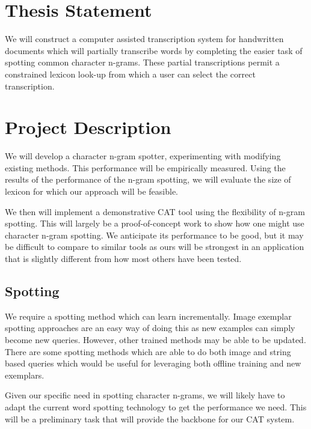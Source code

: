 \documentclass[ms]{byuprop}
\begin{document}
\section{Thesis Statement}


We will construct a computer assisted transcription system for handwritten documents which will partially transcribe words by completing the easier task of spotting common character n-grams. These partial transcriptions permit a constrained lexicon look-up from which a user can select the correct transcription. 

\section{Project Description}

We will develop a character n-gram spotter, experimenting with modifying existing methods.
This performance will be empirically measured. Using the results of the performance of the n-gram spotting, we will evaluate the size of lexicon for which our approach will be feasible.

We then will implement a demonstrative CAT tool using the flexibility of n-gram spotting. This will largely be a proof-of-concept work to show how one might use character n-gram spotting. We anticipate its performance to be good, but it may be difficult to compare to similar tools as ours will be strongest in an application that is slightly different from how most others have been tested.


\subsection{Spotting}
We require a spotting method which can learn incrementally. Image exemplar spotting approaches are an easy way of doing this as new examples can simply become new queries. However, other trained methods may be able to be updated. There are some spotting methods which are able to do both image and string based queries\cite{Almazan2014} which would be useful for leveraging both offline training and new exemplars.

Given our specific need in spotting character n-grams, we will likely have to adapt the current word spotting technology to get the performance we need. This will be a preliminary task that will provide the backbone for our CAT system.
\end{document}
